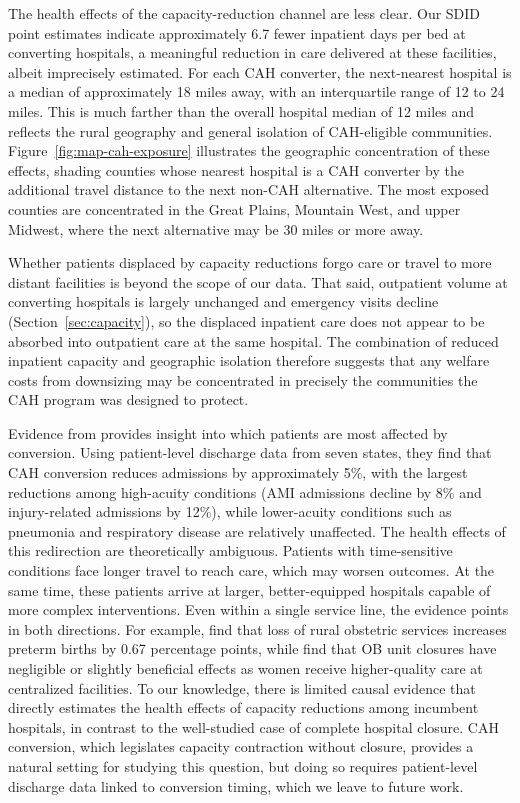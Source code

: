 \documentclass[a4paper, 12pt, twoside]{article}
\begin{document}
The health effects of the capacity-reduction channel are less clear. Our SDID point estimates indicate approximately 6.7 fewer inpatient days per bed at converting hospitals, a meaningful reduction in care delivered at these facilities, albeit imprecisely estimated. For each CAH converter, the next-nearest hospital is a median of approximately 18 miles away, with an interquartile range of 12 to 24 miles. This is much farther than the overall hospital median of 12 miles and reflects the rural geography and general isolation of CAH-eligible communities. Figure~\ref{fig:map-cah-exposure} illustrates the geographic concentration of these effects, shading counties whose nearest hospital is a CAH converter by the additional travel distance to the next non-CAH alternative. The most exposed counties are concentrated in the Great Plains, Mountain West, and upper Midwest, where the next alternative may be 30 miles or more away.

Whether patients displaced by capacity reductions forgo care or travel to more distant facilities is beyond the scope of our data. That said, outpatient volume at converting hospitals is largely unchanged and emergency visits decline (Section~\ref{sec:capacity}), so the displaced inpatient care does not appear to be absorbed into outpatient care at the same hospital. The combination of reduced inpatient capacity and geographic isolation therefore suggests that any welfare costs from downsizing may be concentrated in precisely the communities the CAH program was designed to protect.

Evidence from \cite{gowrisankaran2018} provides insight into which patients are most affected by conversion. Using patient-level discharge data from seven states, they find that CAH conversion reduces admissions by approximately 5\%, with the largest reductions among high-acuity conditions (AMI admissions decline by 8\% and injury-related admissions by 12\%), while lower-acuity conditions such as pneumonia and respiratory disease are relatively unaffected. The health effects of this redirection are theoretically ambiguous. Patients with time-sensitive conditions face longer travel to reach care, which may worsen outcomes. At the same time, these patients arrive at larger, better-equipped hospitals capable of more complex interventions. Even within a single service line, the evidence points in both directions. For example, \cite{kozhimannil2018} find that loss of rural obstetric services increases preterm births by 0.67 percentage points, while \cite{fischer2024} find that OB unit closures have negligible or slightly beneficial effects as women receive higher-quality care at centralized facilities. To our knowledge, there is limited causal evidence that directly estimates the health effects of capacity reductions among incumbent hospitals, in contrast to the well-studied case of complete hospital closure. CAH conversion, which legislates capacity contraction without closure, provides a natural setting for studying this question, but doing so requires patient-level discharge data linked to conversion timing, which we leave to future work.
\end{document}
